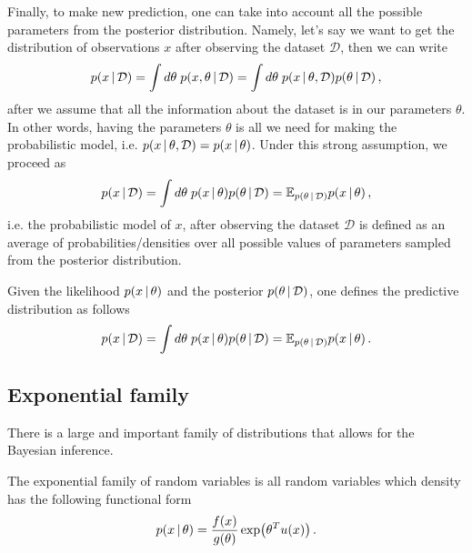 Finally, to make new prediction, one can take into account all the possible parameters from the posterior distribution.
Namely, let's say we want to get the distribution of observations $x$ after observing the dataset $\mathcal{D}$, then we can write 
\begin{align}
    p(x\,|\, \mathcal{D}) = \int d\theta\; p(x,\theta \,|\, \mathcal{D}) = \int d\theta\; p(x \,|\, \theta, \mathcal{D}) p(\theta \,|\, \mathcal{D})\,,
\end{align}
after we assume that all the information about the dataset is in our parameters $\theta$.
In other words, having the parameters $\theta$ is all we need for making the probabilistic model, i.e. $p(x \,|\, \theta, \mathcal{D}) = p(x \,|\, \theta)$.
Under this strong assumption, we proceed as
\begin{align}
    p(x\,|\, \mathcal{D}) = \int d\theta\; p(x \,|\, \theta) p(\theta \,|\, \mathcal{D}) = \mathbb{E}_{p(\theta \,|\, \mathcal{D})} p(x \,|\, \theta)\,,
\end{align}
i.e. the probabilistic model of $x$, after observing the dataset $\mathcal{D}$ is defined as an average of probabilities/densities over all possible values of parameters sampled from the posterior distribution.
\begin{mybox}
\begin{definition}\label{def:predictive_dist}
    Given the likelihood $p(x \,|\, \theta)$ and the posterior $p(\theta \,|\, \mathcal{D})$, one defines the predictive distribution as follows
    \begin{align}
        p(x\,|\, \mathcal{D}) = \int d\theta\; p(x \,|\, \theta) p(\theta \,|\, \mathcal{D}) = \mathbb{E}_{p(\theta \,|\, \mathcal{D})} p(x \,|\, \theta)\,.
    \end{align}
\end{definition}
\end{mybox}

\subsection{Exponential family}

There is a large and important family of distributions that allows for the Bayesian inference.
\begin{mybox}
\begin{definition}\label{def:expo_family}
    The exponential family of random variables is all random variables which density has the following functional form
    \begin{align}
        p(x\cond \theta) = \frac{f(x)}{g(\theta)}\exp\left(\theta^Tu(x)\right)\,.
    \end{align}
\end{definition}
\end{mybox}

